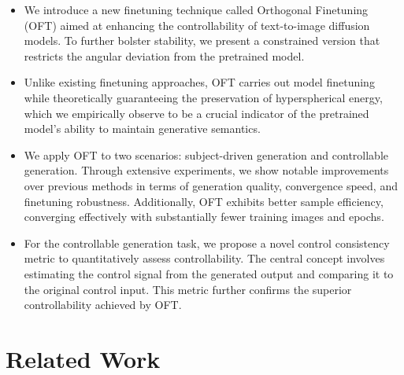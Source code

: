 \begin{itemize}[leftmargin=*,nosep]

    \item We introduce a new finetuning technique called Orthogonal Finetuning (OFT) aimed at enhancing the controllability of text-to-image diffusion models. To further bolster stability, we present a constrained version that restricts the angular deviation from the pretrained model.
    \item Unlike existing finetuning approaches, OFT carries out model finetuning while theoretically guaranteeing the preservation of hyperspherical energy, which we empirically observe to be a crucial indicator of the pretrained model’s ability to maintain generative semantics.
    \item We apply OFT to two scenarios: subject-driven generation and controllable generation. Through extensive experiments, we show notable improvements over previous methods in terms of generation quality, convergence speed, and finetuning robustness. Additionally, OFT exhibits better sample efficiency, converging effectively with substantially fewer training images and epochs.
    \item For the controllable generation task, we propose a novel control consistency metric to quantitatively assess controllability. The central concept involves estimating the control signal from the generated output and comparing it to the original control input. This metric further confirms the superior controllability achieved by OFT.
\end{itemize}

\section{Related Work}


